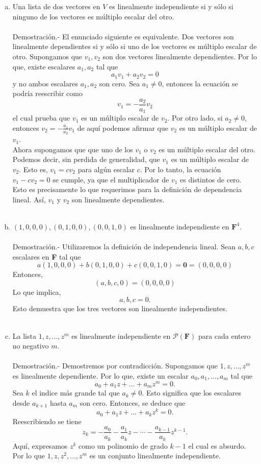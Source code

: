 \begin{enumerate}[\bfseries 1.]
\begin{enumerate}[(a)]
	    \item Una lista de dos vectores en $V$ es linealmente independiente si y sólo si ninguno de los vectores es múltiplo escalar del otro. \\\\
		Demostración.-\; El enunciado siguiente es equivalente. Dos vectores son linealmente dependientes si y sólo si uno de los vectores es múltiplo escalar de otro. Supongamos que $v_1,v_2$ son dos vectores linealmente dependientes. Por lo que, existe escalares $a_1,a_2$ tal que 
		$$a_1v_1+a_2v_2=0$$
		y no ambos escalares $a_1,a_2$ son cero. Sea $a_1\neq 0$, entonces la ecuación se podría reescribir como
		$$v_1=-\dfrac{a_2}{a_1}v_2$$
		el cual prueba que $v_1$ es un múltiplo escalar de $v_2$. Por otro lado, si $a_2\neq 0$, entonces $v_2=-\frac{a_1}{a_2}v_1$ de aquí podemos afirmar que $v_2$ es un múltiplo escalar de $v_1$.\\
		Ahora supongamos que que uno de los $v_1$ o $v_2$ es un múltiplo escalar del otro. Podemos decir, sin perdida de generalidad, que $v_1$ es un múltiplo escalar de $v_2$. Esto es, $v_1=cv_2$ para algún escalar $c$. Por lo tanto, la ecuación $v_1-cv_2=0$ se cumple, ya que el multiplicador de $v_1$ es distintos de cero. Esto es precisamente lo que requerimos para la definición de dependencia lineal. Así, $v_1$ y $v_2$ son linealmente dependientes.\\\\

	    \item $(1,0,0,0),(0,1,0,0),(0,0,1,0)$ es linealmente independiente en $\textbf{F}^4$.\\\\
		Demostración.-\; Utilizaremos la definición de independencia lineal. Sean $a,b,c$ escalares en \textbf{F} tal que
		$$a(1,0,0,0)+b(0,1,0,0)+c(0,0,1,0)=\textbf{0}=(0,0,0,0)$$
		Entonces,
		$$(a,b,c,0)=(0,0,0,0)$$
		Lo que implica,
		$$a,b,c=0.$$
		Esto demuestra que los tres vectores son linealmente independientes.\\\\


	    \item La lista $1,z,\ldots,z^m$ es linealmente independiente en $\mathcal{P}(\textbf{F})$ para cada entero no negativo $m$.\\\\
		Demostración.-\; Demostremos por contradicción. Supongamos que $1,z,\ldots,z^m$ es linealmente dependiente. Por lo que, existe un escalar $a_0,a_1,\ldots,a_m$ tal que
		$$a_0+a_1z+\ldots+a_mz^m=0.$$
		Sea $k$ el indice más grande tal que $a_k\neq 0$. Esto significa que los escalares desde $a_{k+1}$ hasta $a_m$ son cero. Entonces, se deduce que
		$$a_0+a_1z+\ldots+a_kz^k=0.$$
		Reescribiendo se tiene
		$$z_k=-\dfrac{a_0}{a_k}-\dfrac{a_1}{a_k}z-\cdots-\dfrac{a_{k-1}}{a_k}z^{k-1}.$$
		Aquí, expresamos $z^k$ como un polinomio de grado $k-1$ el cual es absurdo. Por lo que $1,z,z^2,\ldots,z^m$ es un conjunto linealmente independiente.\\\\


\end{enumerate}
\end{enumerate}
